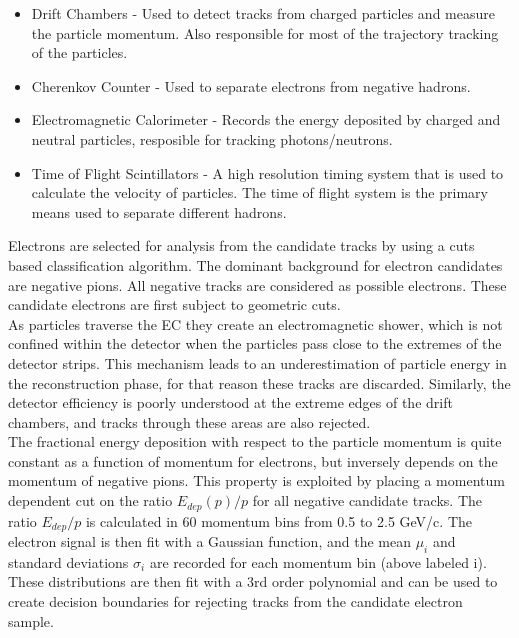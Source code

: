 \begin{itemize}
	\item Drift Chambers - Used to detect tracks from charged particles and measure the particle momentum.  Also responsible for most of the trajectory tracking of the particles.
	\item Cherenkov Counter - Used to separate electrons from negative hadrons.
	\item Electromagnetic Calorimeter - Records the energy deposited by charged and neutral particles, resposible for tracking photons/neutrons.
	\item Time of Flight Scintillators - A high resolution timing system that is used to calculate the velocity of particles.  The time of flight system is the primary means used to separate different hadrons.  
\end{itemize}

Electrons are selected for analysis from the candidate tracks by using a cuts based classification algorithm.  The dominant background for electron candidates are negative pions.  All negative tracks are considered as possible electrons.  These candidate electrons are first subject to geometric cuts.  
\\
As particles traverse the EC they create an electromagnetic shower, which is not confined within the detector when the particles pass close to the extremes of the detector strips.  This mechanism leads to an underestimation of particle energy in the reconstruction phase, for that reason these tracks are discarded.  Similarly, the detector efficiency is poorly understood at the extreme edges of the drift chambers, and tracks through these areas are also rejected.  
\\
The fractional energy deposition with respect to the particle momentum is quite constant as a function of momentum for electrons, but inversely depends on the momentum of negative pions.  This property is exploited by placing a momentum dependent cut on the ratio $E_{dep}(p)/p$ for all negative candidate tracks.  The ratio $E_{dep}/p$ is calculated in 60 momentum bins from 0.5 to 2.5 GeV/c.  The electron signal is then fit with a Gaussian function, and the mean $\mu_i$ and standard deviations $\sigma_i$ are recorded for each momentum bin (above labeled i).  These distributions are then fit with a 3rd order polynomial and can be used to create decision boundaries for rejecting tracks from the candidate electron sample.  
\\

        




